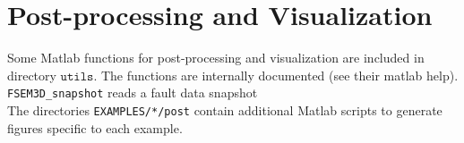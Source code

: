 \section{Post-processing and Visualization}

Some Matlab functions for post-processing and visualization are included
in directory $\mathtt{utils}$. The functions are internally documented
(see their matlab help).\\


\texttt{FSEM3D\_snapshot} reads a fault data snapshot\\

\noindent
The directories \texttt{EXAMPLES/*/post} contain additional Matlab
scripts to generate figures specific to each example.
